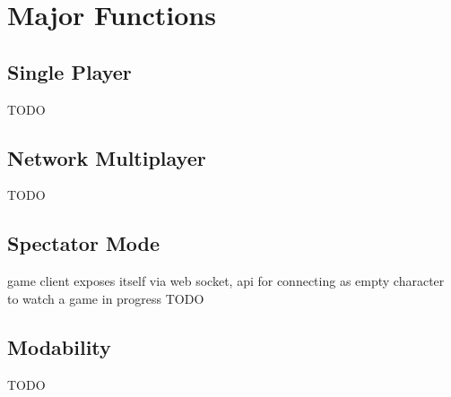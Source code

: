 \section{Major Functions} \label{sec:product_functions}


\subsection{Single Player}
TODO

\subsection{Network Multiplayer}
TODO

\subsection{Spectator Mode}
game client exposes itself via web socket, api for connecting as empty character
to watch a game in progress
TODO

\subsection{Modability}
TODO

 
